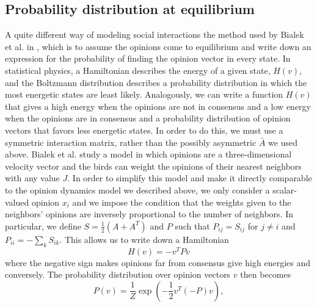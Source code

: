 \documentclass{article}
\DeclareRobustCommand{\cite}[1]{\citep{#1}}
\begin{document}
\subsection{Probability distribution at equilibrium }
A quite different way of modeling social interactions the method used by Bialek et al. in \cite{Bialek:2012fk}, which is to assume the opinions come to equilibrium and write down an expression for the probability of finding the opinion vector in every state. In statistical physics, a Hamiltonian describes the energy of a given state, $H(v)$, and the Boltzmann distribution describes a probability distribution in which the most energetic states are least likely. Analogously, we can write a function $H(v)$ that gives a high energy when the opinions are not in consensus and a low energy when the opinions are in consensus and a probability distribution of opinion vectors that favors less energetic states. In order to do this, we must use a symmetric interaction matrix, rather than the possibly asymmetric $\bar{A}$ we used above. Bialek et al. study a model in which opinions are a three-dimensional velocity vector and the birds can weight the opinions of their nearest neighbors with any value $J$. In order to simplify this model and make it directly comparable to the opinion dynamics model we described above, we only consider a scalar-valued opinion $x_i$ and we impose the condition that the weights given to the neighbors' opinions are inversely proportional to the number of neighbors. In particular, we define $S=\frac{1}{2}(A+A^T)$ and $P$ such that $P_{ij}=S_{ij}$ for $j\neq i$ and $P_{ii}=-\sum_kS_{ik}$. This allows us to write down a Hamiltonian
\begin{equation}
H(v)=-v^TPv
\end{equation}
where the negative sign makes opinions far from consensus give high energies and conversely. The probability distribution over opinion vectors $v$ then becomes 
\begin{equation}
P(v)=\frac{1}{Z}\exp\left(-\frac{1}{2}v^T(-P)v\right),
\end{equation}
\end{document}
